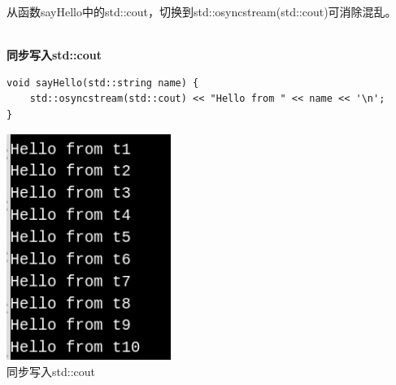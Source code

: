从函数sayHello中的std::cout，切换到std::osyncstream(std::cout)可消除混乱。

\hspace*{\fill} \\ %
\noindent
\textbf{同步写入std::cout}
\begin{lstlisting}[style=styleCXX]
void sayHello(std::string name) {
	std::osyncstream(std::cout) << "Hello from " << name << '\n';
}
\end{lstlisting}

\begin{center}
\includegraphics[width=0.4\textwidth]{content/2/chapter3/images/12.png}\\
同步写入std::cout
\end{center}
